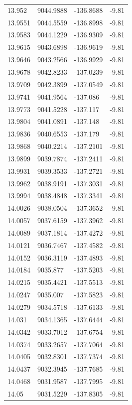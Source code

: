 \begin{table}[H]
\begin{tabular}{llll}
13.952 & 9044.9888 & -136.8688 & -9.81 \\
13.9551 & 9044.5559 & -136.8998 & -9.81 \\
13.9583 & 9044.1229 & -136.9309 & -9.81 \\
13.9615 & 9043.6898 & -136.9619 & -9.81 \\
13.9646 & 9043.2566 & -136.9929 & -9.81 \\
13.9678 & 9042.8233 & -137.0239 & -9.81 \\
13.9709 & 9042.3899 & -137.0549 & -9.81 \\
13.9741 & 9041.9564 & -137.086 & -9.81 \\
13.9773 & 9041.5228 & -137.117 & -9.81 \\
13.9804 & 9041.0891 & -137.148 & -9.81 \\
13.9836 & 9040.6553 & -137.179 & -9.81 \\
13.9868 & 9040.2214 & -137.2101 & -9.81 \\
13.9899 & 9039.7874 & -137.2411 & -9.81 \\
13.9931 & 9039.3533 & -137.2721 & -9.81 \\
13.9962 & 9038.9191 & -137.3031 & -9.81 \\
13.9994 & 9038.4848 & -137.3341 & -9.81 \\
14.0026 & 9038.0504 & -137.3652 & -9.81 \\
14.0057 & 9037.6159 & -137.3962 & -9.81 \\
14.0089 & 9037.1814 & -137.4272 & -9.81 \\
14.0121 & 9036.7467 & -137.4582 & -9.81 \\
14.0152 & 9036.3119 & -137.4893 & -9.81 \\
14.0184 & 9035.877 & -137.5203 & -9.81 \\
14.0215 & 9035.4421 & -137.5513 & -9.81 \\
14.0247 & 9035.007 & -137.5823 & -9.81 \\
14.0279 & 9034.5718 & -137.6133 & -9.81 \\
14.031 & 9034.1365 & -137.6444 & -9.81 \\
14.0342 & 9033.7012 & -137.6754 & -9.81 \\
14.0374 & 9033.2657 & -137.7064 & -9.81 \\
14.0405 & 9032.8301 & -137.7374 & -9.81 \\
14.0437 & 9032.3945 & -137.7685 & -9.81 \\
14.0468 & 9031.9587 & -137.7995 & -9.81 \\
14.05 & 9031.5229 & -137.8305 & -9.81 \\

\end{tabular}
\end{table}
